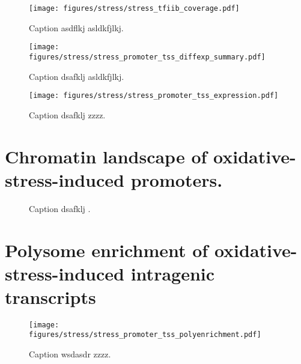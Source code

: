 \begin{figure}
\texttt{[image: figures/stress/stress\_tfiib\_coverage.pdf]}
\label{fig:stress_tfiib_coverage}
\caption[TFIIB ChIP-nexus protection over four genes with stress-induced intragenic TFIIB peaks.]{Caption asdflkj asldkfjlkj.}
\end{figure}

\begin{figure}
\texttt{[image: figures/stress/stress\_promoter\_tss\_diffexp\_summary.pdf]}
\caption[Bar plot of the number of promoters from various genomic classes differentially expressed in oxidative stress.]{Caption dsafklj asldkfjlkj.}
\label{fig:stress_promoter_tss_diffexp_summary}
\end{figure}

\begin{figure}
\texttt{[image: figures/stress/stress\_promoter\_tss\_expression.pdf]}
\caption[TSS-seq expression levels in oxidative stress of oxidative-stress-induced genic and intragenic promoters.]{Caption dsafklj zzzz.}
\label{fig:stress_promoter_tss_diffexp_summary}
\end{figure}

\section{Chromatin landscape of oxidative-stress-induced promoters.}

\begin{figure}
\caption[A figure showing TSS-seq, TFIIB ChIP-nexus, and MNase-ChIP-seq for the oxidative-stress-induced promoters.]{Caption dsafklj .}
\end{figure}

\section{Polysome enrichment of oxidative-stress-induced intragenic transcripts}

\begin{figure}
\texttt{[image: figures/stress/stress\_promoter\_tss\_polyenrichment.pdf]}
\caption[Polysome enrichment in oxidative stress, for oxidative-stress-induced genic and intragenic promoters.]{Caption wsdasdr zzzz.}
\label{fig:stress_promoter_tss_polyenrichment}
\end{figure}

